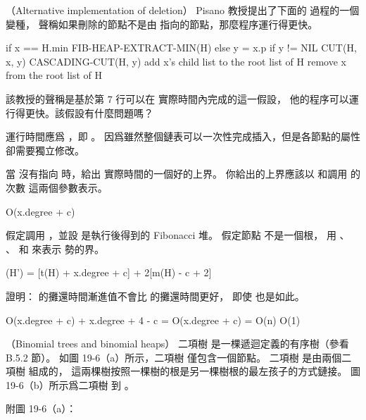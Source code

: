 \startsubject[
  title={Problems},
]

\startPROBLEM
（Alternative implementation of deletion）
Pisano 教授提出了下面的  過程的一個變種，
聲稱如果刪除的節點不是由  指向的節點，那麼程序運行得更快。

\startCLRS
if x == H.min
	FIB-HEAP-EXTRACT-MIN(H)
else
	y = x.p
	if y != NIL
		CUT(H, x, y)
		CASCADING-CUT(H, y)
	add x's child list to the root list of H
	remove x from the root list of H
\stopCLRS

\startigBase[a]\startitem
該教授的聲稱是基於第 7 行可以在  實際時間內完成的這一假設，
他的程序可以運行得更快。該假設有什麼問題嗎？
\stopitem\stopigBase

\startANSWER
運行時間應爲 ，即 。
因爲雖然整個鏈表可以一次性完成插入，但是各節點的屬性  卻需要獨立修改。
\stopANSWER

\startigBase[continue]\startitem
當  沒有指向  時，給出  實際時間的一個好的上界。
你給出的上界應該以  和調用  的次數  這兩個參數表示。
\stopitem\stopigBase

\startANSWER
\startformula
O(x.degree + c)
\stopformula
\stopANSWER

\startigBase[continue]\startitem
假定調用 ，並設  是執行後得到的 Fibonacci 堆。
假定節點  不是一個根，
用 、 、  和  來表示  勢的界。
\stopitem\stopigBase

\startANSWER
\startformula
\Phi(H') = [t(H) + x.degree + c] + 2[m(H) - c + 2]
\stopformula
\stopANSWER

\startigBase[continue]\startitem
證明：  的攤還時間漸進值不會比  的攤還時間更好，
即使  也是如此。
\stopitem\stopigBase

\startANSWER
\startformula
O(x.degree + c) + x.degree + 4 - c = O(x.degree + c) = O(\lg n) \gt O(1)
\stopformula
\stopANSWER

\stopPROBLEM

\startPROBLEM
（Binomial trees and binomial heaps）
二項樹  是一棵遞迴定義的有序樹（參看 B.5.2 節）。
如圖 19-6（a）所示，二項樹  僅包含一個節點。
二項樹  是由兩個二項樹  組成的，
這兩棵樹按照一棵樹的根是另一棵樹根的最左孩子的方式鏈接。
圖 19-6（b）所示爲二項樹  到 。

附圖 19-6（a）：

